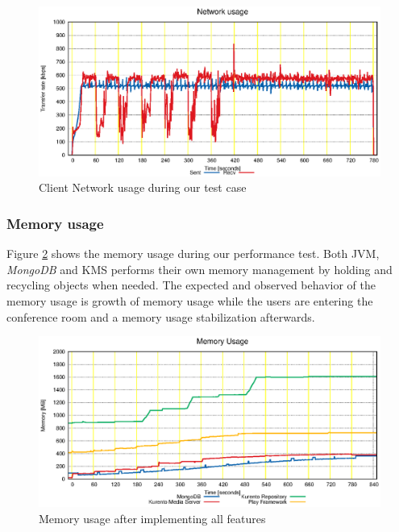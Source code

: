\begin{figure}
  \centering
  \includegraphics[width=\textwidth]{stats/test_client_net.eps}
  \caption{Client Network usage during our test case}
  \label{fig:test_client_net}
\end{figure}



\subsubsection{Memory usage}


Figure \ref{fig:test_full_features_mem} shows the memory usage during our performance test. Both \ac{JVM}, \emph{MongoDB} and \ac{KMS} performs their own memory management by holding and recycling objects when needed. The expected and observed behavior of the memory usage is growth of memory usage while the users are entering the conference room and a memory usage stabilization afterwards.



\begin{figure}
  \centering
  \includegraphics[width=\textwidth]{stats/test_full_features_mem.eps}
  \caption{Memory usage after implementing all features}
  \label{fig:test_full_features_mem}
\end{figure}


